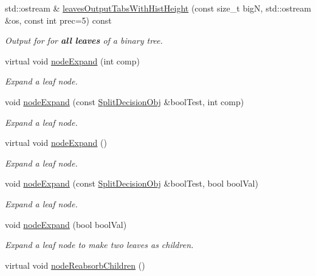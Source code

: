 \begin{DoxyCompactItemize}
std\-::ostream \& \hyperlink{classsubpavings_1_1SPSVnode_a8419f16a2f0667bc190a4a9ed41121c1}{leaves\-Output\-Tabs\-With\-Hist\-Height} (const size\-\_\-t big\-N, std\-::ostream \&os, const int prec=5) const 
\begin{DoxyCompactList}\small\item\em \-Output for for {\bfseries all leaves} of a binary tree. \end{DoxyCompactList}\item 
virtual void \hyperlink{classsubpavings_1_1SPSVnode_a94c33927011a8d2613d40ccf6ccfafc1}{node\-Expand} (int comp)
\begin{DoxyCompactList}\small\item\em \-Expand a leaf node. \end{DoxyCompactList}\item 
void \hyperlink{classsubpavings_1_1SPSVnode_acbad110f9ed41364774c9e2fea658594}{node\-Expand} (const \hyperlink{classsubpavings_1_1SplitDecisionObj}{\-Split\-Decision\-Obj} \&bool\-Test, int comp)
\begin{DoxyCompactList}\small\item\em \-Expand a leaf node. \end{DoxyCompactList}\item 
virtual void \hyperlink{classsubpavings_1_1SPSVnode_a0eb85efd74fa770f3259d6ba948b65b8}{node\-Expand} ()
\begin{DoxyCompactList}\small\item\em \-Expand a leaf node. \end{DoxyCompactList}\item 
void \hyperlink{classsubpavings_1_1SPSVnode_ada1ce5002ee4985a22d35d8cb651d191}{node\-Expand} (const \hyperlink{classsubpavings_1_1SplitDecisionObj}{\-Split\-Decision\-Obj} \&bool\-Test, bool bool\-Val)
\begin{DoxyCompactList}\small\item\em \-Expand a leaf node. \end{DoxyCompactList}\item 
void \hyperlink{classsubpavings_1_1SPSVnode_a4846c8d9c7d29d0f0850a7a9c30eec2b}{node\-Expand} (bool bool\-Val)
\begin{DoxyCompactList}\small\item\em \-Expand a leaf node to make two leaves as children. \end{DoxyCompactList}\item 
virtual void \hyperlink{classsubpavings_1_1SPSVnode_aed19a06dc479c2edc865243d2c131c30}{node\-Reabsorb\-Children} ()

\end{DoxyCompactItemize}
